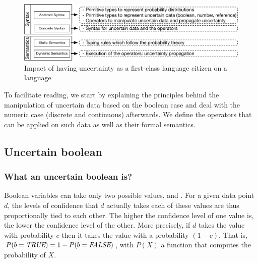 \begin{figure}
	\centering
	\includegraphics[width=\linewidth]{img/chapt-aintea/duc/sumup-contrib}
	\caption{Impact of having uncertainty as a first-class language citizen on a language}
	\label{fig:contrib-summary}
\end{figure}


To facilitate reading, we start by explaining the principles behind the manipulation of uncertain data based on the boolean case and deal with the numeric case (discrete and continuous) afterwards. 
We define the operators that can be applied on such data as well as their formal semantics.

\subsection{Uncertain boolean}

\subsubsection{What an uncertain boolean is?}
Boolean variables can take only two possible values, \true{} and \false{}.
For a given data point $d$, the levels of confidence that $d$ actually takes each of these values are thus proportionally tied to each other. The higher the confidence level of one value is, the lower the confidence level of the other.
More precisely, if $d$ takes the value \true{} with probability $c$ then it takes the value \false{} with a probability $(1-c)$.
That is, $P(b=\textit{TRUE}{}) = 1 - P(b=\textit{FALSE}{})$, with $P(X)$ a function that computes the probability of $X$.

